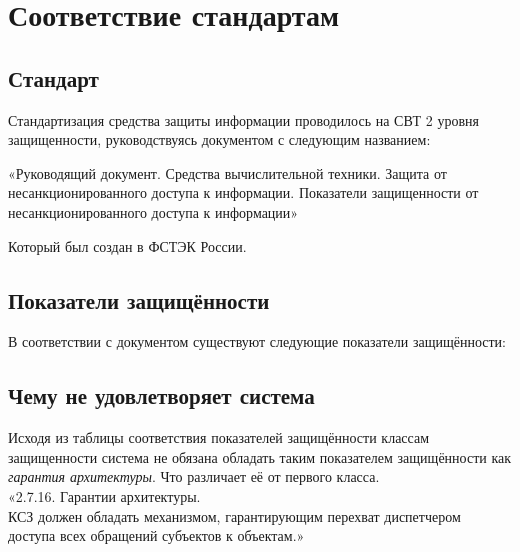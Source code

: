 \section{Соответствие стандартам}
\subsection{Стандарт}
Стандартизация средства защиты информации проводилось на СВТ 2 уровня защищенности, руководствуясь документом с следующим названием:\\
\begin{center}
«Руководящий документ. Средства вычислительной техники. Защита от несанкционированного доступа к информации. Показатели защищенности от несанкционированного доступа к информации»
\cite{FSTECrdNSD}
\end{center}
Который был создан в ФСТЭК России.

\subsection{Показатели защищённости}
В соответствии с документом существуют следующие показатели защищённости:\\

\subsection{Чему не удовлетворяет система}
Исходя из таблицы соответствия показателей защищённости классам защищенности
система не обязана обладать таким показателем защищённости как \textit{гарантия архитектуры}.
Что различает её от первого класса.\\

«2.7.16. Гарантии архитектуры.\\
КСЗ должен обладать механизмом, гарантирующим перехват диспетчером доступа всех обращений субъектов к объектам.»\cite{FSTECrdNSD}\\

